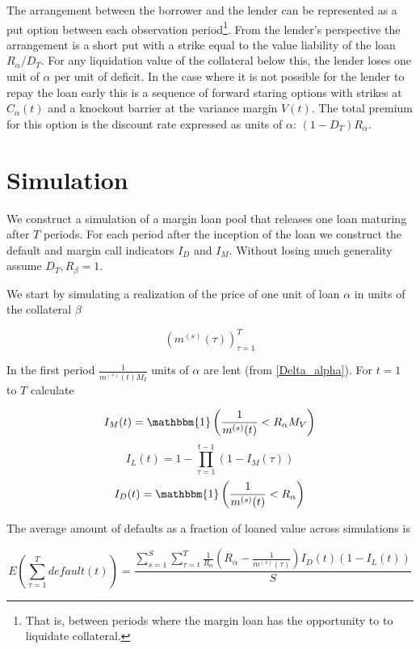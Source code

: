 \documentclass[12pt]{article}
\begin{document}
The arrangement between the borrower and the lender can be represented as a put option between each observation period\footnote{That is, between periods where the margin loan has the opportunity to to liquidate collateral.}. From the lender's perspective the arrangement is a short put with a strike equal to the value liability of the loan $R_\alpha/D_T$. For any liquidation value of the collateral below this, the lender loses one unit of $\alpha$ per unit of deficit. In the case where it is not possible for the lender to repay the loan early this is a sequence of forward staring options with strikes at $C_\alpha(t)$ and a knockout barrier at the variance margin $V(t)$. The total premium for this option is the discount rate expressed as units of $\alpha$: $(1-D_T) R_\alpha$.





\section{Simulation}

We construct a simulation of a margin loan pool that releases one loan maturing after $T$ periods. For each period after the inception of the loan we construct the default and margin call indicators $I_D$ and $I_M$. Without losing much generality assume $D_T, R_\beta = 1$.

We start by simulating a realization of the price of one unit of loan $\alpha$ in units of the collateral $\beta$

\[\left(m^{(s)}(\tau)\right)_{\tau=1}^{T}\]

In the first period $\frac{1}{m^{(s)}(t) M_I}$ units of $\alpha$ are lent (from \ref{Delta_alpha}). For $t=1$ to $T$ calculate 

     \[ I_M(t) = \mathbbm{1}\left( \frac{1}{m^{(s)}(t)}< R_\alpha M_V \right) \]
     \[ I_L(t) = 1-\prod_{\tau=1}^{t-1} \left(1-I_M(\tau) \right)\]
     \[ I_D(t) = \mathbbm{1} \left( \frac{1}{m^{(s)}(t)} < R_\alpha \right) \]

The average amount of defaults as a fraction of loaned value across simulations is

\begin{equation} \label{EDefaultSim}
     E\left(\sum_{\tau=1}^T default(t)\right) = \frac{\sum_{s=1}^S \sum_{\tau=t}^{T} \frac{1}{R_\alpha}  \left(R_\alpha - \frac{1}{m^{(s)}(\tau)} \right) I_D(t) (1-I_L(t))}{S } 
\end{equation}
\end{document}
